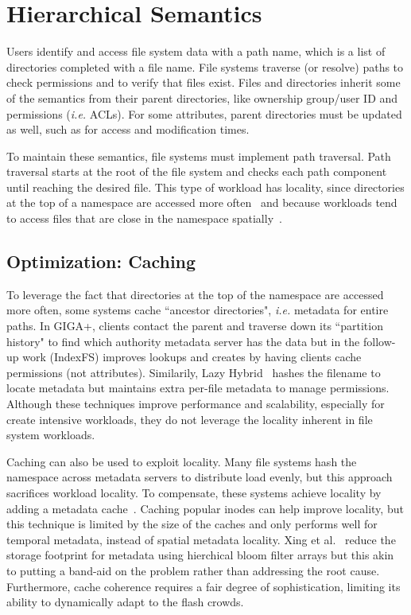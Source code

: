 \section{Hierarchical Semantics}

Users identify and access file system data with a path name, which is a list of
directories completed with a file name.  File systems traverse (or resolve)
paths to check permissions and to verify that files exist. Files and
directories inherit some of the semantics from their parent directories, like
ownership group/user ID and permissions ({\it i.e.} ACLs). For some attributes,
parent directories must be updated as well, such as for access and modification
times. 

To maintain these semantics, file systems must implement path traversal. Path
traversal starts at the root of the file system and checks each path component
until reaching the desired file. This type of workload has locality, since
directories at the top of a namespace are accessed more often~\cite{indexfs}
and because workloads tend to access files that are close in the namespace
spatially~\cite{weilthesis}.

\subsection{Optimization: Caching}

To leverage the fact that directories at the top of the namespace are accessed
more often, some systems cache ``ancestor directories", {\it i.e.} metadata for
entire paths. In GIGA+, clients contact the parent and traverse down its
``partition history" to find which authority metadata server has the data but
in the follow-up work (IndexFS) improves lookups and creates by having clients
cache permissions (not attributes).  Similarily, Lazy
Hybrid~\cite{brandt:mss2003-lh} hashes the filename to locate metadata but
maintains extra per-file metadata to manage permissions.  Although these
techniques improve performance and scalability, especially for create intensive
workloads, they do not leverage the locality inherent in file system workloads.

Caching can also be used to exploit locality.  Many file systems hash the
namespace across metadata servers to distribute load evenly, but this approach
sacrifices workload locality. To compensate, these systems achieve locality by
adding a metadata cache~\cite{li:msst2006-dynamic, xing:sc2009-skyfs,
zhu:pds2008-hba}.  Caching popular inodes can help improve locality, but this
technique is limited by the size of the caches and only performs well for
temporal metadata, instead of spatial metadata locality. Xing et
al.~\cite{xing:sc2009-skyfs} reduce the storage footprint for metadata using
hierchical bloom filter arrays but this akin to putting a band-aid on the
problem rather than addressing the root cause.  Furthermore, cache coherence
requires a fair degree of sophistication, limiting its ability to dynamically
adapt to the flash crowds.

